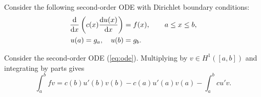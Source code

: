 \documentclass{homework}
\begin{document}
	\maketitle
	
	Consider the following second-order ODE with Dirichlet boundary conditions:
	\begin{align}
		\label{eq:ode}
		\frac{\text{d} {}}{\text{d} {x}}\left(c(x)\frac{\text{d} {u(x)}}{\text{d} {x}}\right) &= f(x),\qquad a \le x \le b, \\
		\label{eq:bc}
		u(a) = g_a,\quad u(b) &= g_b.
	\end{align}
	
	\question
	Consider the second-order ODE (\ref{eq:ode}). Multiplying by $v \in H^1([a,b])$ and integrating by parts gives
	\begin{equation}
		\label{eq:ibp}
		\int_a^bfv = c(b)u'(b)v(b) - c(a)u'(a)v(a) - \int_a^b cu'v.
	\end{equation}
	
\end{document}
